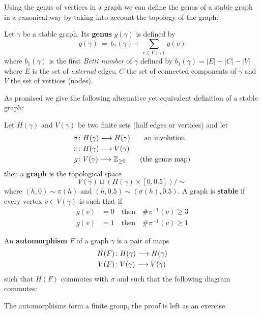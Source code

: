 Using the genus of vertices in a graph we can define the genus of a stable graph in a canonical way by taking into account the topology of the graph:

\begin{definition}
  Let $\gamma$ be a stable graph. Its \textbf{genus} $g(\gamma)$ is defined by
  $$ g(\gamma) \ = \ b_1(\gamma) + \sum_{v\in V(\gamma)} g(v) $$
  where $b_1(\gamma)$ is the first \emph{Betti number} of $\gamma$ defined by $b_1(\gamma) = |E| + |C| - |V|$ where $E$ is the set of \emph{external} edges, $C$ the set of connected components of $\gamma$ and $V$ the set of vertices (nodes).
\end{definition}

As promised we give the following alternative yet equivalent definition of a stable graph:

\begin{definition}
  Let $H(\gamma)$ and $V(\gamma)$ be two finite sets (half edges or vertices) and let
  \begin{align*}
    \sigma &\colon H(\gamma) \longrightarrow H(\gamma) \quad \quad \text{an involution}\\
    \pi &\colon H(\gamma) \longrightarrow V(\gamma)\\
    g &\colon V(\gamma) \longrightarrow \mathbb{Z}_{\geq 0} \quad \quad \text{(the genus map)}
  \end{align*}
  then a \textbf{graph} is the topological space
  $$ V(\gamma) \sqcup (H(\gamma) \times [0, 0.5]) / \sim $$
  where $(h,0) \sim \pi(h)$ and $(h,0.5) \sim (\sigma(h), 0.5)$. A graph is \textbf{stable} if every vertex $v \in V(\gamma)$ is such that if
  \begin{align*}
    g(v) &= 0 \quad \text{then} \quad \# \pi^{-1}(v) \geq 3\\
    g(v) &= 1 \quad \text{then} \quad \# \pi^{-1}(v) \geq 1
  \end{align*}
\end{definition}

\begin{definition}
  An \textbf{automorphism} $F$ of a graph $\gamma$ is a pair of maps
  \begin{align*}
    H(F) &\colon H(\gamma) \longrightarrow H(\gamma)\\
    V(F) &\colon V(\gamma) \longrightarrow V(\gamma)
  \end{align*}
  such that $H(F)$ commutes with $\sigma$ and such that the following diagram commutes:
  \begin{center}
  \end{center}
  The automorphisms form a finite group, the proof is left as an exercise.
\end{definition}

